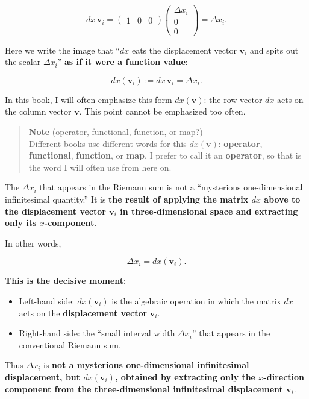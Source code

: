 \[
dx\,\mathbf{v}_i
=
\begin{pmatrix} 1 & 0 & 0 \end{pmatrix}
\begin{pmatrix} \Delta x_i \\ 0 \\ 0 \end{pmatrix}
=
\Delta x_i.
\]

Here we write the image that ``\(dx\) eats the displacement vector
\(\mathbf{v}_i\) and spits out the scalar \(\Delta x_i\)''
\textbf{as if it were a function value}:

\[
dx(\mathbf{v}_i)
:=
dx\,\mathbf{v}_i
=
\Delta x_i.
\]

In this book, I will often emphasize this form \(dx(\mathbf{v})\): the
row vector \(dx\) acts on the column vector \(\mathbf{v}\). This point
cannot be emphasized too often.

\begin{quote}
\textbf{Note} (operator, functional, function, or map?)\\
Different books use different words for this \(dx(\mathbf{v})\):
\textbf{operator}, \textbf{functional}, \textbf{function}, or
\textbf{map}. I prefer to call it an \textbf{operator}, so that is the
word I will often use from here on.
\end{quote}

The \(\Delta x_i\) that appears in the Riemann sum is not a ``mysterious
one-dimensional infinitesimal quantity.'' It is
\textbf{the result of applying the matrix $dx$ above to the displacement vector $\mathbf{v}_i$ in three-dimensional space and extracting only its $x$-component}.

In other words,

\[
\Delta x_i = dx(\mathbf{v}_i).
\]

\textbf{This is the decisive moment}:

\begin{itemize}
\item
  Left-hand side: \(dx(\mathbf{v}_i)\) is the algebraic operation in
  which the matrix \(dx\) acts on the \textbf{displacement vector}
  \(\mathbf{v}_i\).
\item
  Right-hand side: the ``small interval width \(\Delta x_i\)'' that
  appears in the conventional Riemann sum.
\end{itemize}

Thus \(\Delta x_i\) is
\textbf{not a mysterious one-dimensional infinitesimal displacement, but $dx(\mathbf{v}_i)$, obtained by extracting only the $x$-direction component from the three-dimensional infinitesimal displacement $\mathbf{v}_i$}.

